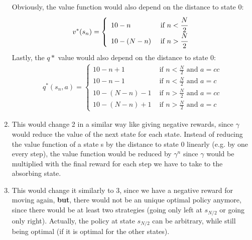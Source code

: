 \begin{enumerate}
    Obviously, the value function would also depend on the distance to state 0:
    \begin{align}
        v^*(s_n)=
        \left\{
            \begin{array}{ll}
                10-n &\mbox{ if }n<\cfrac{N}{2}\\
                10-(N-n) &\mbox{ if }n>\cfrac{N}{2}
            \end{array}
        \right.
    \end{align}
    Lastly, the $q*$ value would also depend on the distance to state 0:
    \begin{align}
        q^*(s_n, a)=
        \left\{
            \begin{array}{llll}
                10-n+1 &\mbox{ if }n<\frac{N}{2}\mbox{ and } a=cc\\
                10-n-1 &\mbox{ if }n<\frac{N}{2}\mbox{ and } a=c\\
                10-(N-n)-1 &\mbox{ if }n>\frac{N}{2}\mbox{ and } a=cc\\
                10-(N-n)+1 &\mbox{ if }n>\frac{N}{2}\mbox{ and } a=c
            \end{array}
        \right.
    \end{align}
    \item This would change 2 in a similar way like giving negative rewards, since $\gamma$ would reduce the 
    value of the next state for each state. Instead of reducing the value function of a state s by the distance to state 0 linearly (e.g. by one every step),
    the value function would be reduced by $\gamma^n$ since $\gamma$ would be multiplied with the final reward for
    each step we have to take to the absorbing state.
    \item This would change it similarly to 3, since we have a negative reward for moving again, \textbf{but}, there would not be an unique optimal policy anymore, since there would be at least two strategies (going only left at $s_{N/2}$ or going only right). Actually, the policy
    at state $s_{N/2}$ can be arbitrary, while still being optimal (if it is optimal for the other states).
\end{enumerate}